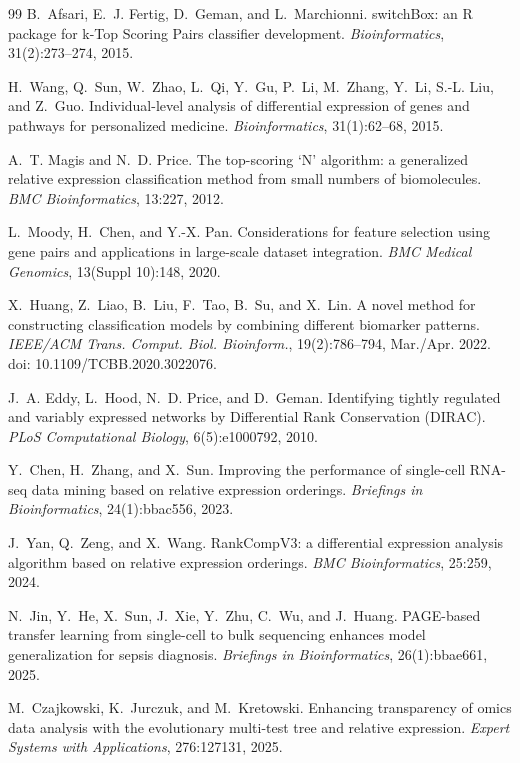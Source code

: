 \documentclass[preprint,12pt,a4paper]{elsarticle}
\begin{document}
\begin{thebibliography}{99}
B.~Afsari, E.~J. Fertig, D.~Geman, and L.~Marchionni.
\newblock switchBox: an R package for k-Top Scoring Pairs classifier development.
\newblock \emph{Bioinformatics}, 31(2):273--274, 2015.

H.~Wang, Q.~Sun, W.~Zhao, L.~Qi, Y.~Gu, P.~Li, M.~Zhang, Y.~Li, S.-L. Liu, and Z.~Guo.
\newblock Individual-level analysis of differential expression of genes and pathways for personalized medicine.
\newblock \emph{Bioinformatics}, 31(1):62--68, 2015.

A.~T. Magis and N.~D. Price.
\newblock The top-scoring `N' algorithm: a generalized relative expression classification method from small numbers of biomolecules.
\newblock \emph{BMC Bioinformatics}, 13:227, 2012.

L.~Moody, H.~Chen, and Y.-X. Pan.
\newblock Considerations for feature selection using gene pairs and applications in large-scale dataset integration.
\newblock \emph{BMC Medical Genomics}, 13(Suppl 10):148, 2020.


X.~Huang, Z.~Liao, B.~Liu, F.~Tao, B.~Su, and X.~Lin.
\newblock A novel method for constructing classification models by combining different biomarker patterns.
\newblock \emph{IEEE/ACM Trans. Comput. Biol. Bioinform.}, 19(2):786--794, Mar./Apr. 2022.
\newblock doi: 10.1109/TCBB.2020.3022076.

J.~A. Eddy, L.~Hood, N.~D. Price, and D.~Geman.
\newblock Identifying tightly regulated and variably expressed networks by Differential Rank Conservation (DIRAC).
\newblock \emph{PLoS Computational Biology}, 6(5):e1000792, 2010.

Y.~Chen, H.~Zhang, and X.~Sun.
\newblock Improving the performance of single-cell RNA-seq data mining based on relative expression orderings.
\newblock \emph{Briefings in Bioinformatics}, 24(1):bbac556, 2023.

J.~Yan, Q.~Zeng, and X.~Wang.
\newblock RankCompV3: a differential expression analysis algorithm based on relative expression orderings.
\newblock \emph{BMC Bioinformatics}, 25:259, 2024.

N.~Jin, Y.~He, X.~Sun, J.~Xie, Y.~Zhu, C.~Wu, and J.~Huang.
\newblock PAGE-based transfer learning from single-cell to bulk sequencing enhances model generalization for sepsis diagnosis.
\newblock \emph{Briefings in Bioinformatics}, 26(1):bbae661, 2025.

M.~Czajkowski, K.~Jurczuk, and M.~Kretowski.
\newblock Enhancing transparency of omics data analysis with the evolutionary multi-test tree and relative expression.
\newblock \emph{Expert Systems with Applications}, 276:127131, 2025.


\end{thebibliography}
\end{document}
